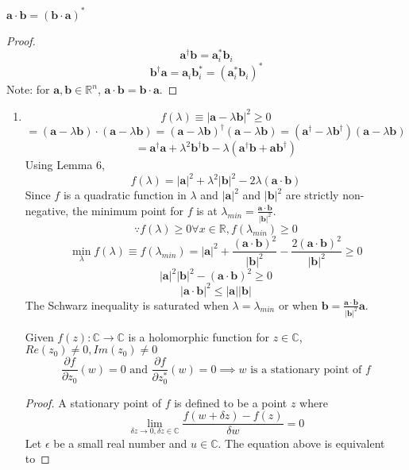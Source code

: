 \begin{sol}
\begin{lemma}
$\mathbf{a}\cdot\mathbf{b}=(\mathbf{b}\cdot\mathbf{a})^*$
\end{lemma}
\begin{proof} 
$$\mathbf a^\dagger\mathbf b=\mathbf{a}_i^*\mathbf{b}_i$$
$$\mathbf b^\dagger\mathbf a=\mathbf{a}_i\mathbf{b}_i^*=(\mathbf a^*_i\mathbf b_i)^*$$
Note: for $\mathbf a, \mathbf b\in\mathbb{R}^n$, $\mathbf{a}\cdot\mathbf{b}=\mathbf{b}\cdot\mathbf{a}$.
\end{proof}
\begin{enumerate}[label=\textbf{(\alph*)}]
\item
$$f(\lambda)\equiv|\mathbf{a}-\lambda\mathbf{b}|^2\geq 0$$ 
$$=(\mathbf{a}-\lambda\mathbf{b})\cdot(\mathbf{a}-\lambda\mathbf{b})=(\mathbf{a}-\lambda\mathbf{b})^\dagger(\mathbf{a}-\lambda\mathbf{b})=(\mathbf{a}^\dagger-\lambda\mathbf{b}^\dagger)(\mathbf{a}-\lambda\mathbf{b})$$ 
$$=\mathbf{a}^\dagger\mathbf a+\lambda^2\mathbf b^\dagger \mathbf b-\lambda (\mathbf a^\dagger\mathbf b+\mathbf{ab}^\dagger)$$
Using Lemma 6,
$$f(\lambda)=|\mathbf{a}|^2+\lambda^2|\mathbf{b}|^2-2\lambda (\mathbf a\cdot\mathbf b)$$
Since $f$ is a quadratic function in $\lambda$ and $|\mathbf{a}|^2$ and $|\mathbf{b}|^2$ are strictly non-negative, the minimum point for $f$ is at $\lambda_{min}=\frac{\mathbf{a}\cdot\mathbf{b}}{|\mathbf{b}|^2}$. $$\because f(\lambda)\geq 0\forall x\in\mathbb{R}, f(\lambda_{min})\geq 0$$ 
$$\min_{\lambda}f(\lambda)\equiv f(\lambda_{min})=|\mathbf{a}|^2+\frac{(\mathbf{a}\cdot\mathbf{b})^2}{|\mathbf{b}|^2}-\frac{2(\mathbf{a}\cdot\mathbf{b})^2}{|\mathbf{b}|^2}\geq 0$$
$$|\mathbf{a}|^2|\mathbf{b}|^2-(\mathbf{a}\cdot\mathbf{b})^2\geq 0$$
$$|\mathbf{a}\cdot\mathbf{b}|^2\leq|\mathbf{a}||\mathbf{b}|$$ 
The Schwarz inequality is saturated when $\lambda=\lambda_{min}$ or when $\displaystyle{\mathbf{b}=\frac{\mathbf{a}\cdot\mathbf{b}}{|\mathbf b|^2}\mathbf{a}}$.
\begin{lemma}
Given $f(z):\mathbb{C}\to\mathbb{C}$ is a holomorphic function for $z\in\mathbb{C}$, $Re(z_0)\neq 0, Im(z_0)\neq 0$
$$\frac{\partial f}{\partial z_0}(w)=0 \text{ and }\frac{\partial f}{\partial z_0^*}(w)=0\implies w \text{ is a stationary point of }f$$
\end{lemma}
\begin{proof}
A stationary point of $f$ is defined to be a point $z$ where
$$\lim_{\delta z\to 0,\delta z\in\mathbb{C}} \frac{f(w+\delta z)-f(z)}{\delta w}=0$$
Let $\epsilon$ be a small real number and $u\in\mathbb C$. The equation above is equivalent to 

\end{proof}
\end{enumerate}
\end{sol}
